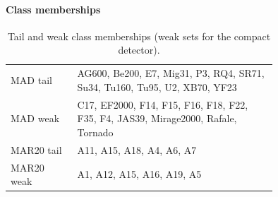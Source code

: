 \paragraph{Class memberships}
\begin{table}[h]\centering\small
\caption{Tail and weak class memberships (weak sets for the compact detector).}
\begin{tabular}{lp{0.75\linewidth}}\toprule
MAD tail & AG600, Be200, E7, Mig31, P3, RQ4, SR71, Su34, Tu160, Tu95, U2, XB70, YF23 \\
MAD weak & C17, EF2000, F14, F15, F16, F18, F22, F35, F4, JAS39, Mirage2000, Rafale, Tornado \\
\midrule
MAR20 tail & A11, A15, A18, A4, A6, A7 \\
MAR20 weak & A1, A12, A15, A16, A19, A5 \\
\bottomrule\end{tabular}\end{table}
